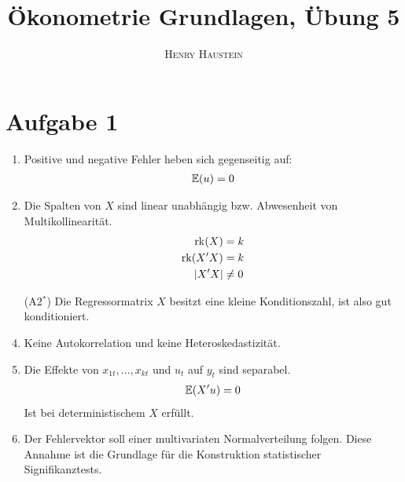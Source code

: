 \documentclass{article}
\title{\textbf{Ökonometrie Grundlagen, Übung 5}}
\author{\textsc{Henry Haustein}}
\date{}
\newcommand{\E}{\mathbb{E}}
\DeclareMathOperator{\rk}{rk}
\begin{document}
	\maketitle
	
	\section*{Aufgabe 1}
	\begin{enumerate}[label=(A\arabic*)]
		\item Positive und negative Fehler heben sich gegenseitig auf:
		\begin{align}
		\E(u) = 0 \notag
		\end{align}
		\item Die Spalten von $X$ sind linear unabhängig bzw. Abwesenheit von Multikollinearität.
		\begin{align}
		\rk(X) &= k \notag \\
		\rk(X'X) &= k \notag \\
		\vert X'X\vert &\neq 0 \notag
		\end{align}
		\item[(A2$^\ast$)] Die Regressormatrix $X$ besitzt eine kleine Konditionszahl, ist also gut konditioniert.
		\item Keine Autokorrelation und keine Heteroskedastizität.
		\item Die Effekte von $x_{1t},...,x_{kt}$ und $u_t$ auf $y_t$ sind separabel.
		\begin{align}
		\E(X'u) = 0 \notag
		\end{align}
		Ist bei deterministischem $X$ erfüllt.
		\item Der Fehlervektor soll einer multivariaten Normalverteilung folgen. Diese Annahme ist die Grundlage für die Konstruktion statistischer Signifikanztests.
	\end{enumerate}
	
\end{document}
